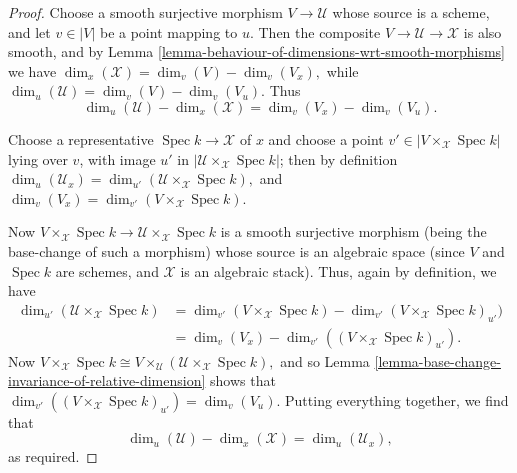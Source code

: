 \documentclass[10pt,a4paper]{amsart}
\theoremstyle{plain}
\theoremstyle{definition}
\theoremstyle{remark}
\numberwithin{equation}{subsection}
\def\Spec{\mathop{\mathrm{Spec}}}
\begin{document}
\begin{proof}
Choose a smooth surjective morphism $V \to \mathcal{U}$ whose source
is a scheme, and let $v\in |V|$ be a point mapping to $u$.
Then the composite $V \to \mathcal{U} \to \mathcal{X}$ is also smooth,
and by Lemma \ref{lemma-behaviour-of-dimensions-wrt-smooth-morphisms}
we have $\dim_x(\mathcal{X}) = \dim_v(V) - \dim_v(V_x),$
while $\dim_u(\mathcal{U}) = \dim_v(V) - \dim_v(V_u).$
Thus
$$
\dim_u(\mathcal{U}) - \dim_x(\mathcal{X}) = \dim_v (V_x) - \dim_v (V_u).
$$

\medskip\noindent
Choose a representative $\Spec k \to \mathcal{X}$ of $x$
and choose a point $v' \in | V \times_{\mathcal{X}} \Spec k|$ lying over
$v$, with image $u'$ in $|\mathcal{U}\times_{\mathcal{X}} \Spec k|$;
then by definition
$\dim_u(\mathcal{U}_x) = \dim_{u'}(\mathcal{U}\times_{\mathcal{X}} \Spec k),$
and
$\dim_v(V_x) = \dim_{v'}(V\times_{\mathcal{X}} \Spec k).$

\medskip\noindent
Now $V\times_{\mathcal{X}} \Spec k \to \mathcal{U}\times_{\mathcal{X}}\Spec k$
is a smooth surjective morphism (being the base-change
of such a morphism) whose source is an algebraic space
(since $V$ and $\Spec k$ are schemes, and $\mathcal{X}$
is an algebraic stack).  Thus, again by definition,
we have
\begin{align*}
\dim_{u'}(\mathcal{U}\times_{\mathcal{X}} \Spec k)
& =
\dim_{v'}(V\times_{\mathcal{X}} \Spec k) -
\dim_{v'}(V \times_{\mathcal{X}} \Spec k)_{u'}) \\
& = \dim_v(V_x) -
\dim_{v'}( (V\times_{\mathcal{X}} \Spec k)_{u'}).
\end{align*}
Now $V\times_{\mathcal{X}} \Spec k \cong
V\times_{\mathcal{U}} (\mathcal{U}\times_{\mathcal{X}} \Spec k),$
and so
Lemma \ref{lemma-base-change-invariance-of-relative-dimension}
shows that
$\dim_{v'}((V\times_{\mathcal{X}} \Spec k)_{u'})  = \dim_v(V_u).$
Putting everything together, we find that
$$
\dim_u(\mathcal{U}) - \dim_x(\mathcal{X}) =
\dim_u(\mathcal{U}_x),
$$
as required.
\end{proof}
\end{document}
